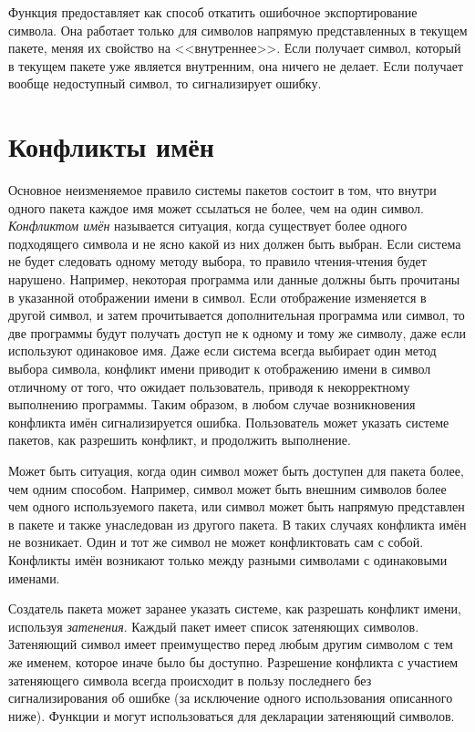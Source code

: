 Функция  предоставляет как способ откатить ошибочное
экспортирование символа. Она работает только для символов напрямую
представленных в текущем пакете, меняя их свойство на <<внутреннее>>.
Если  получает символ, который в текущем пакете уже является
внутренним, она ничего не делает. Если получает вообще недоступный символ, то
сигнализирует ошибку.

\section{Конфликты имён}
\label{NAME-CONFLICTS-SECTION}

Основное неизменяемое правило системы пакетов состоит в том, что внутри одного
пакета каждое имя может ссылаться не более, чем на один символ.
\emph{Конфликтом имён} называется ситуация, когда существует более одного
подходящего символа и не ясно какой из них должен быть выбран. Если система не
будет следовать одному методу выбора, то правило чтения-чтения будет
нарушено. Например, некоторая программа или данные должны быть прочитаны в
указанной отображении имени в символ. Если отображение изменяется в другой
символ, и затем прочитывается дополнительная программа или символ, то две
программы будут получать доступ не к одному и тому же символу, даже если
используют одинаковое имя. Даже если система всегда выбирает один метод выбора
символа, конфликт имени приводит к отображению имени в символ отличному от того,
что ожидает пользователь, приводя к некорректному выполнению программы. Таким
образом, в любом случае возникновения конфликта имён сигнализируется
ошибка. Пользователь может указать системе пакетов, как разрешить конфликт, и
продолжить выполнение.

Может быть ситуация, когда один символ может быть доступен для пакета более, чем
одним способом. Например, символ может быть внешним символов более чем одного
используемого пакета, или символ может быть напрямую представлен в пакете и
также унаследован из другого пакета.
В таких случаях конфликта имён не возникает.
Один и тот же символ не может конфликтовать сам с собой.
Конфликты имён возникают только между разными символами с одинаковыми именами.

Создатель пакета может заранее указать системе, как разрешать конфликт имени,
используя \emph{затенения}. Каждый пакет имеет список затеняющих
символов. Затеняющий символ имеет преимущество перед любым другим символом с тем
же именем, которое иначе было бы доступно. Разрешение конфликта с участием
затеняющего символа всегда происходит в пользу последнего без сигнализирования об
ошибке (за исключение одного использования  описанного
ниже). Функции  и  могут использоваться для
декларации затеняющий символов.

